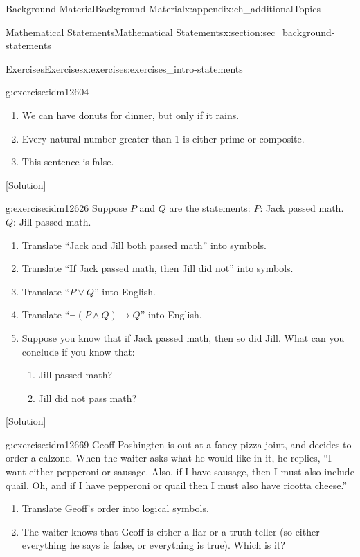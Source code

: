 \documentclass[oneside,10pt,]{book}
\numberwithin{equation}{chapter}
\def\imp{\rightarrow}
\begin{document}
\begin{appendixptx}{Background Material}{}{Background Material}{}{}{x:appendix:ch_additionalTopics}
\begin{sectionptx}{Mathematical Statements}{}{Mathematical Statements}{}{}{x:section:sec_background-statements}
\begin{exercises-subsection}{Exercises}{}{Exercises}{}{}{x:exercises:exercises_intro-statements}
\begin{divisionexercise}{1}{}{}{g:exercise:idm12604}
\begin{enumerate}[label=(\alph*)]
\item{}We can have donuts for dinner, but only if it rains.%
\item{}Every natural number greater than 1 is either prime or composite.%
\item{}This sentence is false.%
\end{enumerate}
%
\space\hspace*{0pt}\hfill{\tiny\hyperlink{g:solution:idm12614-main}{[Solution]}}\end{divisionexercise}%
\begin{divisionexercise}{2}{}{}{g:exercise:idm12626}%
Suppose \(P\) and \(Q\) are the statements: \(P\): Jack passed math. \(Q\): Jill passed math.%
%
\begin{enumerate}[label=(\alph*)]
\item{}Translate ``Jack and Jill both passed math'' into symbols.%
\item{}Translate ``If Jack passed math, then Jill did not'' into symbols.%
\item{}Translate ``\(P \vee Q\)'' into English.%
\item{}Translate ``\(\neg(P \wedge Q) \imp Q\)'' into English.%
\item{}Suppose you know that if Jack passed math, then so did Jill.  What can you conclude if you know that:%
\begin{enumerate}[label=\roman*.]
\item{}Jill passed math?%
\item{}Jill did not pass math?%
\end{enumerate}
%
\end{enumerate}
\space\hspace*{0pt}\hfill{\tiny\hyperlink{g:solution:idm12653-main}{[Solution]}}\end{divisionexercise}%
\begin{divisionexercise}{3}{}{}{g:exercise:idm12669}%
Geoff Poshingten is out at a fancy pizza joint, and decides to order a calzone. When the waiter asks what he would like in it, he replies, ``I want either pepperoni or sausage. Also, if I have sausage, then I must also include quail. Oh, and if I have pepperoni or quail then I must also have ricotta cheese.''%
%
\begin{enumerate}[label=(\alph*)]
\item{}Translate Geoff's order into logical symbols.%
\item{}The waiter knows that Geoff is either a liar or a truth-teller (so either everything he says is false, or everything is true).  Which is it?%

\end{enumerate}
\end{divisionexercise}
\end{exercises-subsection}
\end{sectionptx}
\end{appendixptx}
\end{document}
